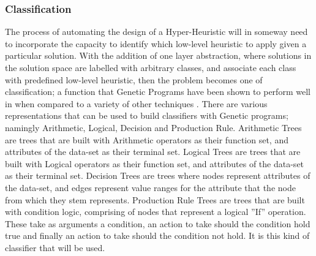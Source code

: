\documentclass[a4paper,12pt]{article}
\begin{document}
        \subsubsection{Classification}
            \par{
                \noindent
                The process of automating the design of a Hyper-Heuristic will in someway need
                to incorporate the capacity to identify which low-level heuristic to apply given a
                particular solution. With the addition of one layer abstraction, where solutions
                in the solution space are labelled with arbitrary classes, and associate each class
                with predefined low-level heuristic, then the problem becomes one of classification; 
                a function that Genetic Programs have been shown to perform well in
                when compared to a variety of other techniques \cite{sgpc}.\newline 
                \newline 
                There are various representations that can be used to build classifiers with Genetic 
                programs; namingly Arithmetic, Logical, Decision and Production Rule.\newline 
                \newline 
                Arithmetic Trees are trees that are built with Arithmetic operators as their
                function set, and attributes of the data-set as their terminal set.\newline 
                \newline 
                Logical Trees are trees that are built with Logical operators as their function
                set, and attributes of the data-set as their terminal set.\newline 
                \newline 
                Decision Trees are trees where nodes represent attributes of the data-set, and
                edges represent value ranges for the attribute that the node from which they
                stem represents.\newline 
                \newline 
                Production Rule Trees are trees that are built with condition logic, comprising 
                of nodes that represent a logical ”If” operation. These take as arguments a
                condition, an action to take should the condition hold true and finally an action
                to take should the condition not hold. It is this kind of classifier that will be used. 
            }
\end{document}
